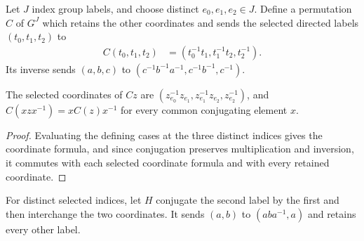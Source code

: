 \begin{definition}%
    \label{def:peps_regular_three_plaquette_coordinates}
    \leanok
    Let $J$ index group labels, and choose distinct $e_0,e_1,e_2\in J$.
    Define a permutation $C$ of $G^J$ which retains the other coordinates and
    sends the selected directed labels $(t_0,t_1,t_2)$ to
    \begin{align}
        C(t_0,t_1,t_2)
         & =(t_0^{-1}t_1,t_1^{-1}t_2,t_2^{-1}).
    \end{align}
    Its inverse sends $(a,b,c)$ to
    $(c^{-1}b^{-1}a^{-1},c^{-1}b^{-1},c^{-1})$.
\end{definition}

\begin{lemma}%
    \label{thm:peps_regular_three_plaquette_coordinates}
    \leanok
    The selected coordinates of $Cz$ are
    $(z_{e_0}^{-1}z_{e_1},z_{e_1}^{-1}z_{e_2},z_{e_2}^{-1})$, and
    $C(xzx^{-1})=xC(z)x^{-1}$ for every common conjugating element $x$.
\end{lemma}
\begin{proof}\leanok
    Evaluating the defining cases at the three distinct indices gives the
    coordinate formula, and since conjugation preserves multiplication and
    inversion, it commutes with each selected coordinate formula and with every
    retained coordinate.
\end{proof}

\begin{definition}%
    \label{def:peps_regular_two_cycle_exchange}
    \leanok
    For distinct selected indices, let $H$ conjugate the second label by the
    first and then interchange the two coordinates. It sends
    $(a,b)$ to $(aba^{-1},a)$ and retains every other label.
\end{definition}

